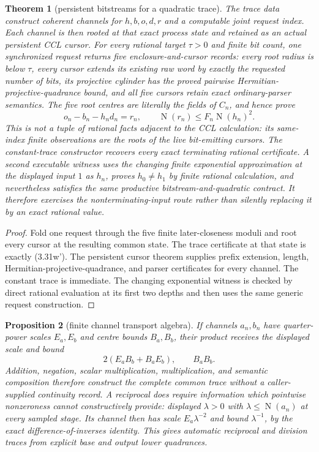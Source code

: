 \documentclass[10pt]{article}
\newtheorem{theorem}{Theorem}[section]
\newtheorem{proposition}[theorem]{Proposition}
\theoremstyle{definition}
\theoremstyle{remark}
\newcommand{\Norm}{\operatorname{N}}
\begin{document}
\begin{theorem}[persistent bitstreams for a quadratic trace]
The trace data construct coherent channels for
$h,b,o,d,r$ and a computable joint request index.  Each channel is then rooted
at that exact process state and retained as an actual persistent CCL cursor.
For every rational target $\tau>0$ and finite bit count, one synchronized
request returns five enclosure-and-cursor records: every root radius is below
$\tau$, every cursor extends its existing raw word by exactly the requested
number of bits, its projective cylinder has the proved pairwise
Hermitian-projective-quadrance bound,
and all five cursors retain exact ordinary-parser semantics.  The five root
centres are literally the fields of $C_n$, and hence prove
\[
 o_n-b_n-h_nd_n=r_n,\qquad \Norm(r_n)\le F_n\Norm(h_n)^2.
 \tag{3.31w'}
\]
This is not a tuple of rational facts adjacent to the CCL calculation: its
same-index finite observations are the roots of the live bit-emitting cursors.
The constant-trace constructor recovers every exact terminating rational
certificate.  A second executable witness uses the changing finite
exponential approximation at the displayed input $1$ as $h_n$, proves
$h_0\ne h_1$ by finite rational calculation, and nevertheless satisfies the
same productive bitstream-and-quadratic contract.  It therefore exercises the
nonterminating-input route rather than silently replacing it by an exact
rational value.
\end{theorem}

\begin{proof}
Fold one request through the five finite later-closeness moduli and root every
cursor at the resulting common state.  The trace certificate at that state
is exactly (3.31w').  The persistent cursor theorem supplies prefix extension,
length, Hermitian-projective-quadrance, and parser certificates for every
channel.  The constant
trace is immediate.  The changing exponential witness is checked by direct
rational evaluation at its first two depths and then uses the same generic
request construction.
\end{proof}

\begin{proposition}[finite channel transport algebra]
If channels $a_n,b_n$ have quarter-power scales $E_a,E_b$ and centre bounds
$B_a,B_b$, their product receives the displayed scale and bound
\[
 2(E_aB_b+B_aE_b),\qquad B_aB_b.
 \tag{3.31w-tr}
\]
Addition, negation, scalar multiplication, multiplication, and semantic
composition therefore construct the complete common trace without a
caller-supplied continuity record.  A reciprocal does require information
which pointwise nonzeroness cannot constructively provide: displayed
$\lambda>0$ with $\lambda\le\Norm(a_n)$ at every sampled stage.  Its channel
then has scale $E_a\lambda^{-2}$ and bound $\lambda^{-1}$, by the exact
difference-of-inverses identity.  This gives automatic reciprocal and
division traces from explicit base and output lower quadrances.
\end{proposition}
\end{document}
